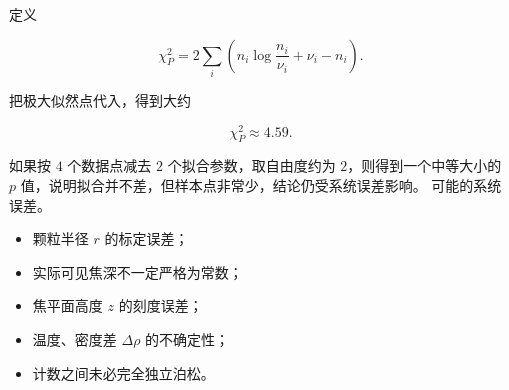 \begin{question}
\begin{solution}
\begin{enumerate}
定义

\[
\chi_P^2=2\sum_i\left(n_i\log\frac{n_i}{\nu_i}+\nu_i-n_i\right).
\]

把极大似然点代入，得到大约

\[
\chi_P^2\approx4.59.
\]

如果按 \(4\) 个数据点减去 \(2\) 个拟合参数，取自由度约为
\(2\)，则得到一个中等大小的 \(p\)
值，说明拟合并不差，但样本点非常少，结论仍受系统误差影响。
可能的系统误差。

\begin{itemize}
\item
  颗粒半径 \(r\) 的标定误差；
\item
  实际可见焦深不一定严格为常数；
\item
  焦平面高度 \(z\) 的刻度误差；
\item
  温度、密度差 \(\Delta\rho\) 的不确定性；
\item
  计数之间未必完全独立泊松。
\end{itemize}
\end{enumerate}
\end{solution}
\end{question}

